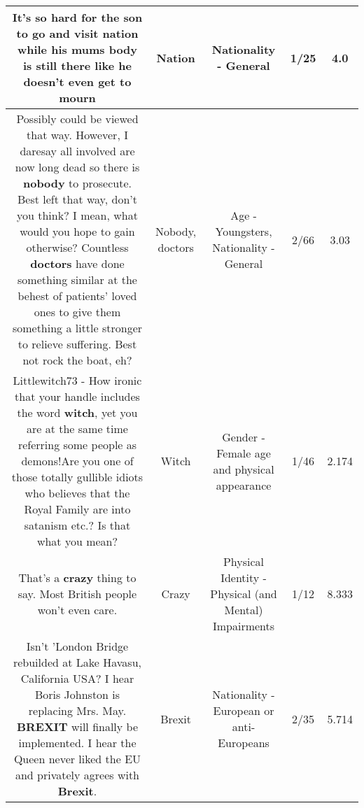 \documentclass[11pt]{article}
\newlength\mylength
\begin{document}
\begin{center}
\begin{longtable}{|C{.65\mylength}|C{.30\mylength}|C{.12\mylength}|C{.12\mylength}|C{.12\mylength}|}
  \small It's so hard for the son to go and visit \textbf{nation} while his mums body is still there like he doesn't even get to mourn\normalsize   & Nation & Nationality - General & 1/25 & 4.0 \\  \hline
  \small Possibly could be viewed that way. However, I daresay all involved are now long dead so there is \textbf{nobody} to prosecute. Best left that way, don't you think? I mean, what would you hope to gain otherwise? Countless \textbf{doctors} have done something similar at the behest of patients' loved ones to give them something a little stronger to relieve suffering. Best not rock the boat, eh?\normalsize   & Nobody, doctors & Age - Youngsters, Nationality - General & 2/66 & 3.03 \\  \hline
  \small Littlewitch73 - How ironic that your handle includes the word \textbf{witch}, yet you are at the same time referring some people as demons!Are you one of those totally gullible idiots who believes that the Royal Family are into satanism etc.? Is that what you mean?\normalsize   & Witch & Gender - Female age and physical appearance & 1/46 & 2.174 \\  \hline
  \small That's a \textbf{crazy} thing to say. Most British people won't even care.\normalsize   & Crazy & Physical Identity - Physical (and Mental) Impairments & 1/12 & 8.333 \\  \hline
  \small Isn't 'London Bridge rebuilded at Lake Havasu, California USA?   I hear Boris Johnston is replacing Mrs. May.    \textbf{BREXIT} will finally be implemented.   I hear the Queen never liked the EU and privately agrees with \textbf{Brexit}.\normalsize   & Brexit & Nationality - European or anti-Europeans & 2/35 & 5.714 \\  \hline

\end{longtable}
\end{center}
\end{document}
